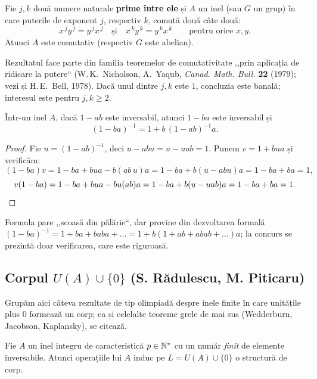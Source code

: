 \begin{teorema}\label{teo:nicholson}
Fie $j,k$ două numere naturale \textbf{prime între ele} și $A$ un inel (sau $G$ un grup) în care puterile de exponent $j$, respectiv $k$, comută două câte două:
\[
x^{\,j}y^{\,j}=y^{\,j}x^{\,j}\quad\text{și}\quad x^{\,k}y^{\,k}=y^{\,k}x^{\,k}\qquad\text{pentru orice }x,y.
\]
Atunci $A$ este comutativ (respectiv $G$ este abelian).
\end{teorema}

Rezultatul face parte din familia teoremelor de comutativitate ,,prin aplicația de ridicare la putere`` (W.\,K.~Nicholson, A.~Yaqub, \emph{Canad. Math. Bull.} \textbf{22} (1979); vezi și H.\,E.~Bell, 1978). Dacă unul dintre $j,k$ este $1$, concluzia este banală; interesul este pentru $j,k\ge2$.

\begin{propozitie}[trucul $1-ab$ / $1-ba$]\label{prop:halmos}
Într-un inel $A$, dacă $1-ab$ este inversabil, atunci $1-ba$ este inversabil și
\[
(1-ba)^{-1}=1+b\,(1-ab)^{-1}a.
\]
\end{propozitie}

\begin{proof}
Fie $u=(1-ab)^{-1}$, deci $u-abu=u-uab=1$. Punem $v=1+bua$ și verificăm:
\[
(1-ba)v=1-ba+bua-b(ab\,u)a=1-ba+b(u-abu)a=1-ba+ba=1,
\]
\[
v(1-ba)=1-ba+bua-bu(ab)a=1-ba+b(u-uab)a=1-ba+ba=1.\qedhere
\]
\end{proof}

\begin{observatie}
Formula pare ,,scoasă din pălărie``, dar provine din dezvoltarea formală $(1-ba)^{-1}=1+ba+baba+\dots=1+b(1+ab+abab+\dots)a$; la concurs se prezintă doar verificarea, care este riguroasă.
\end{observatie}

\subsection*{Corpul $U(A)\cup\{0\}$ (S. Rădulescu, M. Piticaru)}

Grupăm aici câteva rezultate de tip olimpiadă despre inele finite în care unitățile plus $0$ formează un corp; ca și celelalte teoreme grele de mai sus (Wedderburn, Jacobson, Kaplansky), se citează.

\begin{propozitie}\label{prop:rp1}
Fie $A$ un inel integru de caracteristică $p\in\mathbb{N}^*$ cu un număr \emph{finit} de elemente inversabile. Atunci operațiile lui $A$ induc pe $L=U(A)\cup\{0\}$ o structură de corp.
\end{propozitie}

